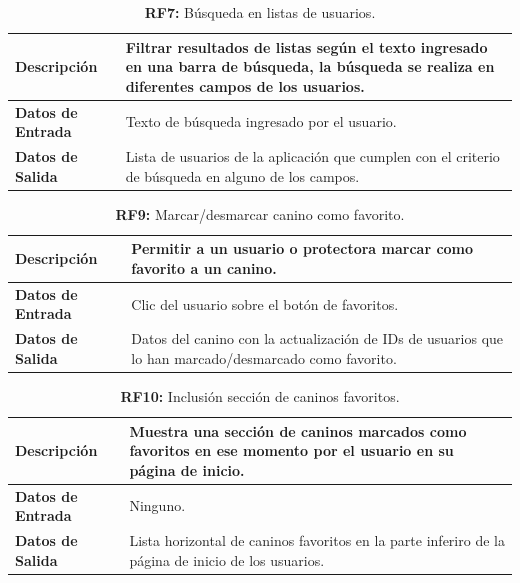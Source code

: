 \documentclass[a4paper, 12pt]{article}
\begin{document}
\begin{table}[H]
\captionsetup{list=no}%
\captionsetup{justification=raggedright,singlelinecheck=false}
\captionsetup{labelformat=empty}
\caption{\textbf{RF7:} Búsqueda en listas de usuarios.}
\label{tab:RF7}
	\begin{tabular}{|m{5cm}|m{10cm}|}
\hline
	\textbf{Descripción} & Filtrar resultados de listas según el texto ingresado en una barra de búsqueda, la búsqueda se realiza en diferentes campos de los usuarios. \\ 
	\hline
	\textbf{Datos de Entrada} & Texto de búsqueda ingresado por el usuario. \\ 
	\hline
	\textbf{Datos de Salida} &  Lista de usuarios de la aplicación que cumplen con el criterio de búsqueda en alguno de los campos. \\ 
	\hline
\end{tabular}
\end{table}

\begin{table}[H]
\captionsetup{list=no}%
\captionsetup{justification=raggedright,singlelinecheck=false}
\captionsetup{labelformat=empty}
\caption{\textbf{RF9:} Marcar/desmarcar canino como favorito.}
\label{tab:RF9}
	\begin{tabular}{|m{5cm}|m{10cm}|}
	\hline
	\textbf{Descripción} & Permitir a un usuario o protectora marcar como favorito a un canino. \\ 
	\hline
	\textbf{Datos de Entrada} & Clic del usuario sobre el botón de favoritos. \\ 
	\hline
	\textbf{Datos de Salida} & Datos del canino con la actualización de IDs de usuarios que lo han marcado/desmarcado como favorito.\\ 
	\hline
\end{tabular}
\end{table}

\begin{table}[H]
\captionsetup{list=no}%
\captionsetup{justification=raggedright,singlelinecheck=false}
\captionsetup{labelformat=empty}
\caption{\textbf{RF10:} Inclusión sección de caninos favoritos.}
\label{tab:RF10}
	\begin{tabular}{|m{5cm}|m{10cm}|}
	\hline
	\textbf{Descripción} & Muestra una sección de caninos marcados como favoritos en ese momento por el usuario en su página de inicio. \\ 
	\hline
	\textbf{Datos de Entrada} & Ninguno. \\ 
	\hline
	\textbf{Datos de Salida} & Lista horizontal de caninos favoritos en la parte inferiro de la página de inicio de los usuarios. \\ 
	\hline
\end{tabular}
\end{table}
\end{document}
